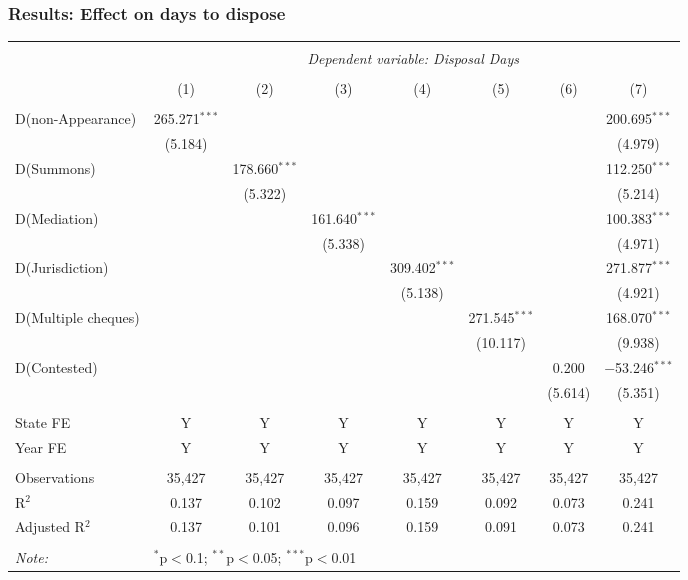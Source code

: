 \documentclass[10pt,aspectratio=169]{beamer}
\begin{document}
\begin{frame}
  \frametitle{Results: Effect on days to dispose}
  \scriptsize
  \begin{longtable}{lccccccc} 
    \\[-1.8ex]
    \hline \\[-1.8ex] 
    & \multicolumn{7}{c}{\textit{Dependent variable: Disposal Days}} \\ 
    \cline{2-8} 
    \\[-1.8ex] & (1) & (2) & (3) & (4) & (5) & (6) & (7)\\ 
    \hline \\[-1.8ex] 
    D(non-Appearance) & 265.271$^{***}$ &  &  &  &  &  & 200.695$^{***}$ \\ 
    & (5.184) &  &  &  &  &  & (4.979) \\ \hline
    D(Summons) &  & 178.660$^{***}$ &  &  &  &  & 112.250$^{***}$ \\ 
    &  & (5.322) &  &  &  &  & (5.214) \\\hline
    D(Mediation) &  &  & 161.640$^{***}$ &  &  &  & 100.383$^{***}$ \\ 
    &  &  & (5.338) &  &  &  & (4.971) \\ \hline
    D(Jurisdiction) &  &  &  & 309.402$^{***}$ &  &  & 271.877$^{***}$ \\ 
    &  &  &  & (5.138) &  &  & (4.921) \\ \hline
    D(Multiple cheques) &  &  &  &  & 271.545$^{***}$ &  & 168.070$^{***}$ \\ 
    &  &  &  &  & (10.117) &  & (9.938) \\\hline
    D(Contested) &  &  &  &  &  & 0.200 & $-$53.246$^{***}$ \\ 
    &  &  &  &  &  & (5.614) & (5.351) \\
    \hline \\[-1.8ex] 
    State FE & Y & Y & Y & Y & Y & Y & Y \\ 
    Year FE & Y & Y & Y & Y & Y & Y & Y \\
    \hline \\[-1.8ex] 
    Observations & 35,427 & 35,427 & 35,427 & 35,427 & 35,427 & 35,427 & 35,427 \\ 
    R$^{2}$ & 0.137 & 0.102 & 0.097 & 0.159 & 0.092 & 0.073 & 0.241 \\ 
    Adjusted R$^{2}$ & 0.137 & 0.101 & 0.096 & 0.159 & 0.091 & 0.073 & 0.241 \\
    \hline \\[-1.8ex] 
    \textit{Note:}  & \multicolumn{7}{l}{$^{*}$p$<$0.1; $^{**}$p$<$0.05; $^{***}$p$<$0.01} \\ 
  \end{longtable}
\end{frame}
\end{document}
